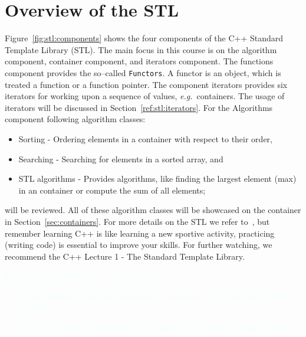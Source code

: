 \section{Overview of the STL}
Figure~\ref{fig:stl:components} shows the four components of the C++ Standard Template Library (STL). The main focus in this course is on the algorithm component, container component, and iterators component. The functions component provides the so--called \texttt{Functors}. A functor is an object, which is treated a function or a function pointer. The component iterators provides six iterators for working upon a sequence of values, \emph{e.g.}\ containers. The usage of iterators will be discussed in Section~\ref{ref:stl:iterators}. For the Algorithms component following algorithm classes:
\begin{itemize}
\item Sorting - Ordering elements in a container with respect to their order,
\item Searching - Searching for elements in a sorted array, and
\item STL algorithms - Provides algorithms, like finding the largest element (max) in an container or compute the sum of all elements;
\end{itemize}
will be reviewed. All of these algorithm classes will be showcased on the container  in Section~\ref{sec:containers}. For more details on the STL we refer to~\cite{o2017mastering,stepanov1995standard}, but remember learning C++ is like learning a new sportive activity, practicing (writing code) is essential to improve your skills. For further watching, we recommend the C++ Lecture 1 - The Standard Template Library.\\ 

\textcolor{azure}{Most important take away of this section is: 
\begin{itemize}
\item Never implement your own algorithm or container, if you can find it within the STL.
\item If you can not find it within the STL, think if you really need this feature.
\end{itemize}
}

